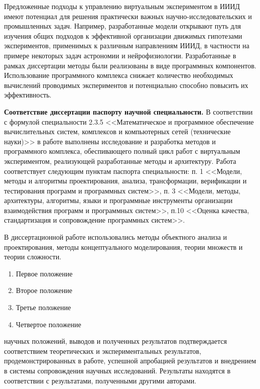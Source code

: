 {\influence} Предложенные подходы к управлению виртуальным экспериментом в ИИИД имеют потенциал для решения практически 
важных научно-исследовательских и промышленных задач. Например, разработанные модели открывают путь для изучения общих 
подходов к эффективной организации движимых гипотезами экспериментов, применимых 
к различным направлениям ИИИД, в частности на примере некоторых задач астрономии и нейрофизиологии.
Разработанные в рамках диссертации методы были реализованы в виде программных компонентов. Использование программного 
комплекса снижает количество необходимых вычислений проводимых экспериментов и потенциально способно 
повысить их эффективность.

\textbf{Соответствие диссертации паспорту научной специальности.}
В соответствии с формулой специальности 2.3.5 <<Математическое и программное обеспечение вычислительных систем, 
комплексов и компьютерных сетей (технические науки)>> в работе выполнены исследование и разработка методов и 
программного комплекса, обеспивающего полный цикл работ с виртуальным экспериментом, 
реализующей разработанные методы и архитектуру. Работа соответствует следующим пунктам паспорта специальности: 
п. 1 <<Модели, методы и алгоритмы проектирования, анализа, трансформации,
верификации и тестирования программ и программных систем>>, п. 3 <<Модели, методы, архитектуры, алгоритмы, 
языки и программные инструменты организации взаимодействия программ и программных систем>>, п.10 <<Оценка качества, 
стандартизация и сопровождение программных систем>>.


{\methods} В диссертационной работе использовались методы объектного анализа и проектирования, методы
концептуального моделирования, теории множеств и теории сложности.

{}
\begin{enumerate}[beginpenalty=10000] %
  \item Первое положение
  \item Второе положение
  \item Третье положение
  \item Четвертое положение
\end{enumerate}

{\reliability} 
научных положений, выводов и полученных результатов подтверждается соответствием
теоретических и экспериментальных результатов, продемонстрированных в работе, успешной апробацией результатов и 
внедрением в системы сопровождения научных исследований. 
Результаты находятся в соответствии с результатами, полученными другими авторами.


